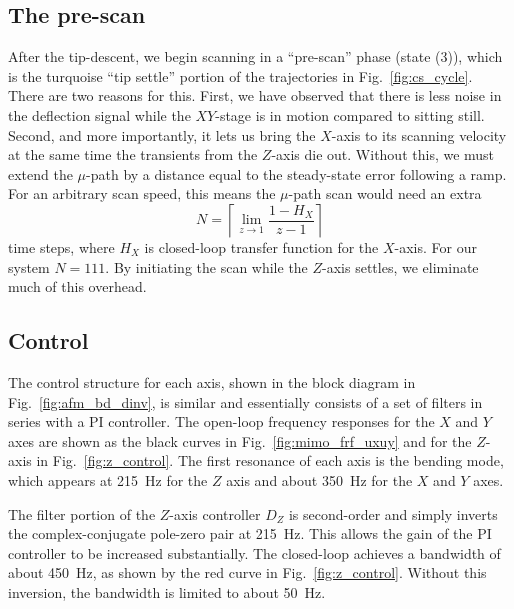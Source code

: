 \documentclass[journal]{IEEEtran}
\begin{document}
\subsection{The pre-scan}
After the tip-descent, we begin scanning in a ``pre-scan'' phase
(state (3)), which is the turquoise ``tip settle'' portion of the trajectories in
Fig.~\ref{fig:cs_cycle}. There are two reasons for this. First, we
have observed that there is less noise in the deflection signal while
the $XY$-stage is in motion compared to sitting still. Second, and more
importantly, it lets us bring the $X$-axis to its scanning velocity at
the same time the transients from the $Z$-axis die out. Without this,
we must extend the $\mu$-path by a distance equal to the steady-state
error following a ramp. For an arbitrary scan speed, this means the
$\mu$-path scan would need an extra
\begin{equation}
  N = \left\lceil\lim_{z\rightarrow 1} \frac{1-H_X}{z-1}\right\rceil
\end{equation}
time steps, where $H_X$ is closed-loop transfer function for the
$X$-axis. For our system $N=111$. By initiating the scan while the
$Z$-axis settles, we eliminate much of this overhead.

\subsection{Control}\label{sec:control}
%   
The control structure for each axis, shown in the block diagram in
Fig.~\ref{fig:afm_bd_dinv}, is similar and essentially consists of a
set of filters in series with a PI controller. The open-loop frequency
responses for the $X$ and $Y$ axes are shown as the black curves in
Fig.~\ref{fig:mimo_frf_uxuy} and for the $Z$-axis in
Fig.~\ref{fig:z_control}. The first resonance of each axis is the
bending mode, which appears at 215~Hz for the $Z$ axis and about
350~Hz for the $X$ and $Y$ axes.

The filter portion of the $Z$-axis controller $D_Z$ is second-order
and simply inverts the complex-conjugate pole-zero pair at 215~Hz.
This allows the gain of the PI controller to be increased
substantially. The closed-loop achieves a bandwidth of about 450~Hz,
as shown by the red curve in Fig.~\ref{fig:z_control}. Without this
inversion, the bandwidth is limited to about 50~Hz.
\end{document}
